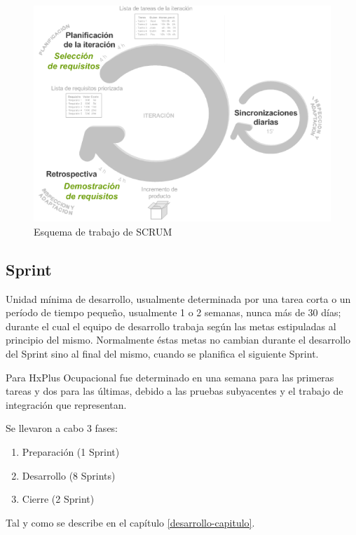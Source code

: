     \begin{figure}[htbp!]
        \begin{center}
            \includegraphics[width=.8\textwidth]{figures/scrum}
        \end{center}
        \caption{Esquema de trabajo de SCRUM}
        \label{scrum-esquema}
    \end{figure}
    
        \subsection{Sprint}
        
        Unidad mínima de desarrollo, usualmente determinada por una tarea corta o un período de tiempo pequeño, usualmente 1 o 2 semanas, nunca más de 30 días; durante el cual el equipo de desarrollo trabaja según las metas estipuladas al principio del mismo. Normalmente éstas metas no cambian durante el desarrollo del Sprint sino al final del mismo, cuando se planifica el siguiente Sprint.
        
        Para HxPlus Ocupacional fue determinado en una semana para las primeras tareas y dos para las últimas, debido a las pruebas subyacentes y el trabajo de integración que representan.
        
        Se llevaron a cabo 3 fases:
        \begin{enumerate}
            \item Preparación (1 Sprint)
            \item Desarrollo (8 Sprints)
            \item Cierre (2 Sprint)
        \end{enumerate}
        
        Tal y como se describe en el capítulo \ref{desarrollo-capitulo}.
        

